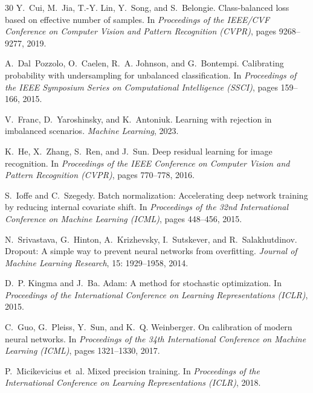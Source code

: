 \documentclass[12pt,a4paper]{article}
\begin{document}
\begin{thebibliography}{30}
Y.~Cui, M.~Jia, T.-Y. Lin, Y.~Song, and S.~Belongie.
\newblock Class-balanced loss based on effective number of samples.
\newblock In \emph{Proceedings of the IEEE/CVF Conference on Computer Vision
  and Pattern Recognition (CVPR)}, pages 9268--9277, 2019.

A.~Dal~Pozzolo, O.~Caelen, R.~A. Johnson, and G.~Bontempi.
\newblock Calibrating probability with undersampling for unbalanced
  classification.
\newblock In \emph{Proceedings of the IEEE Symposium Series on Computational
  Intelligence (SSCI)}, pages 159--166, 2015.

V.~Franc, D.~Yaroshinsky, and K.~Antoniuk.
\newblock Learning with rejection in imbalanced scenarios.
\newblock \emph{Machine Learning}, 2023.

K.~He, X.~Zhang, S.~Ren, and J.~Sun.
\newblock Deep residual learning for image recognition.
\newblock In \emph{Proceedings of the IEEE Conference on Computer Vision and
  Pattern Recognition (CVPR)}, pages 770--778, 2016.

S.~Ioffe and C.~Szegedy.
\newblock Batch normalization: Accelerating deep network training by reducing
  internal covariate shift.
\newblock In \emph{Proceedings of the 32nd International Conference on Machine
  Learning (ICML)}, pages 448--456, 2015.

N.~Srivastava, G.~Hinton, A.~Krizhevsky, I.~Sutskever, and R.~Salakhutdinov.
\newblock Dropout: A simple way to prevent neural networks from overfitting.
\newblock \emph{Journal of Machine Learning Research}, 15: 1929--1958,
  2014.

D.~P. Kingma and J.~Ba.
\newblock Adam: A method for stochastic optimization.
\newblock In \emph{Proceedings of the International Conference on Learning
  Representations (ICLR)}, 2015.

C.~Guo, G.~Pleiss, Y.~Sun, and K.~Q. Weinberger.
\newblock On calibration of modern neural networks.
\newblock In \emph{Proceedings of the 34th International Conference on Machine
  Learning (ICML)}, pages 1321--1330, 2017.

P.~Micikevicius et~al.
\newblock Mixed precision training.
\newblock In \emph{Proceedings of the International Conference on Learning
  Representations (ICLR)}, 2018.


\end{thebibliography}
\end{document}
